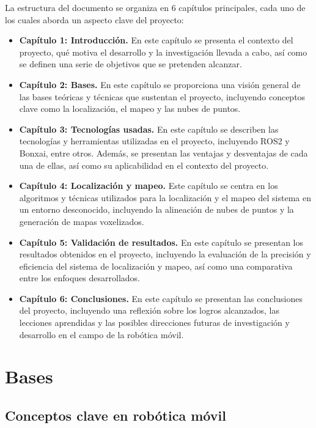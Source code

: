 \documentclass[12pt, a4paper, twoside]{article}
\begin{document}
La estructura del documento se organiza en 6 capítulos principales, cada uno de los cuales aborda un aspecto clave del proyecto:
\begin{itemize}
  \item \textbf{Capítulo 1: Introducción.} En este capítulo se presenta el contexto del proyecto, qué motiva el 
    desarrollo y la investigación llevada a cabo, así como se definen una serie de objetivos que se pretenden alcanzar.
  \item \textbf{Capítulo 2: Bases.} En este capítulo se proporciona una visión general de las bases teóricas y 
    técnicas que sustentan el proyecto, incluyendo conceptos clave como la localización, el mapeo y las nubes de puntos.
  \item \textbf{Capítulo 3: Tecnologías usadas.} En este capítulo se describen las tecnologías y herramientas utilizadas 
    en el proyecto, incluyendo ROS2\cite{doi:10.1126/scirobotics.abm6074} y Bonxai\cite{faconti2024bonxai}, entre otros. 
    Además, se presentan las ventajas y desventajas de cada una de ellas, así como su aplicabilidad en el contexto del proyecto.
  \item \textbf{Capítulo 4: Localización y mapeo.} Este capítulo se centra en los algoritmos y técnicas utilizados para 
    la localización y el mapeo del sistema en un entorno desconocido, incluyendo la alineación de nubes de puntos y la generación 
    de mapas voxelizados.
  \item \textbf{Capítulo 5: Validación de resultados.} En este capítulo se presentan los resultados obtenidos en el proyecto, 
    incluyendo la evaluación de la precisión y eficiencia del sistema de localización y mapeo, así como una comparativa entre 
    los enfoques desarrollados.
  \item \textbf{Capítulo 6: Conclusiones.} En este capítulo se presentan las conclusiones del proyecto, incluyendo una reflexión 
    sobre los logros alcanzados, las lecciones aprendidas y las posibles direcciones futuras de investigación y desarrollo en el 
    campo de la robótica móvil.
\end{itemize}

\newpage

\section{Bases}

\subsection{Conceptos clave en robótica móvil}
\end{document}
